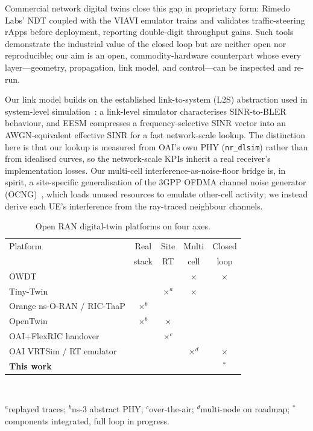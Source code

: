 \documentclass[conference]{IEEEtran}
\newcommand{\y}{\checkmark}
\newcommand{\n}{$\times$}
\begin{document}
Commercial network digital twins close this gap in proprietary form: Rimedo Labs'
NDT coupled with the VIAVI emulator trains and validates traffic-steering rApps
before deployment, reporting double-digit throughput gains. Such tools demonstrate
the industrial value of the closed loop but are neither open nor reproducible; our
aim is an open, commodity-hardware counterpart whose every layer---geometry,
propagation, link model, and control---can be inspected and re-run.

Our link model builds on the established link-to-system (L2S) abstraction used in
system-level simulation~\cite{eesm}: a link-level simulator characterises SINR-to-BLER
behaviour, and EESM compresses a frequency-selective SINR vector into an
AWGN-equivalent effective SINR for a fast network-scale lookup. The distinction
here is that our lookup is measured from OAI's own PHY (\texttt{nr\_dlsim}) rather
than from idealised curves, so the network-scale KPIs inherit a real receiver's
implementation losses. Our multi-cell interference-as-noise-floor bridge is, in
spirit, a site-specific generalisation of the 3GPP OFDMA channel noise generator
(OCNG)~\cite{ocng}, which loads unused resources to emulate other-cell activity;
we instead derive each UE's interference from the ray-traced neighbour channels.

\begin{table}[t]
\caption{Open RAN digital-twin platforms on four axes.}
\label{tab:related}
\centering
\footnotesize
\begin{tabular}{@{}lcccc@{}}
\toprule
Platform & Real & Site & Multi & Closed \\
 & stack & RT & cell & loop \\
\midrule
OWDT~\cite{owdt}                 & \y & \y & \n & \n \\
Tiny-Twin~\cite{tinytwin}        & \y & \n$^{a}$ & \n & \y \\
Orange ns-O-RAN / RIC-TaaP       & \n$^{b}$ & \y & \y & \y \\
OpenTwin~\cite{opentwin}         & \n$^{b}$ & \n & \y & \y \\
OAI+FlexRIC handover~\cite{oaiho}& \y & \n$^{c}$ & \y & \y \\
OAI VRTSim / RT emulator         & \y & \y & \n$^{d}$ & \n \\
\textbf{This work}               & \y & \y & \y & \y$^{*}$ \\
\bottomrule
\end{tabular}
\\[2pt]
\raggedright\scriptsize
$^{a}$replayed traces; $^{b}$ns-3 abstract PHY; $^{c}$over-the-air;
$^{d}$multi-node on roadmap; $^{*}$components integrated, full loop in progress.
\end{table}
\end{document}
